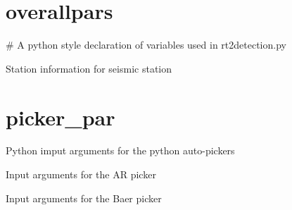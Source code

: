 \documentclass[letterpaper,10pt,english]{sphinxmanual}
\begin{document}
\section{overallpars}
\label{modules:overallpars}\label{modules:module-overallpars}
\# A python style declaration of variables used in rt2detection.py

\begin{fulllineitems}
\label{modules:overallpars.STATION}
Station information for seismic station

\begin{fulllineitems}
\label{modules:overallpars.STATION.stacount}
\end{fulllineitems}


\end{fulllineitems}



\section{picker\_par}
\label{modules:module-picker_par}\label{modules:picker-par}
Python imput arguments for the python auto-pickers

\begin{fulllineitems}
\label{modules:picker_par.AR_ARGS}
Input arguments for the AR picker

\end{fulllineitems}


\begin{fulllineitems}
\label{modules:picker_par.BAER_ARGS}
Input arguments for the Baer picker

\end{fulllineitems}
\end{document}

